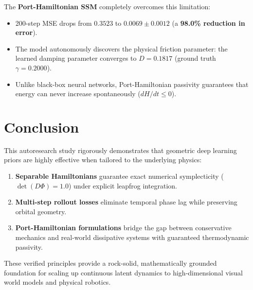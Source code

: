 \documentclass[11pt,a4paper]{article}
\begin{document}
The \textbf{Port-Hamiltonian SSM} completely overcomes this limitation:
\begin{itemize}
    \item 200-step MSE drops from $0.3523$ to \textbf{$0.0069 \pm 0.0012$} (a \textbf{98.0\% reduction in error}).
    \item The model autonomously discovers the physical friction parameter: the learned damping parameter converges to $D = 0.1817$ (ground truth $\gamma = 0.2000$).
    \item Unlike black-box neural networks, Port-Hamiltonian passivity guarantees that energy can never increase spontaneously ($dH/dt \le 0$).
\end{itemize}

\section{Conclusion}
This autoresearch study rigorously demonstrates that geometric deep learning priors are highly effective when tailored to the underlying physics:
\begin{enumerate}
    \item \textbf{Separable Hamiltonians} guarantee exact numerical symplecticity ($\det(D\Phi) = 1.0$) under explicit leapfrog integration.
    \item \textbf{Multi-step rollout losses} eliminate temporal phase lag while preserving orbital geometry.
    \item \textbf{Port-Hamiltonian formulations} bridge the gap between conservative mechanics and real-world dissipative systems with guaranteed thermodynamic passivity.
\end{enumerate}
These verified principles provide a rock-solid, mathematically grounded foundation for scaling up continuous latent dynamics to high-dimensional visual world models and physical robotics.



\end{document}
